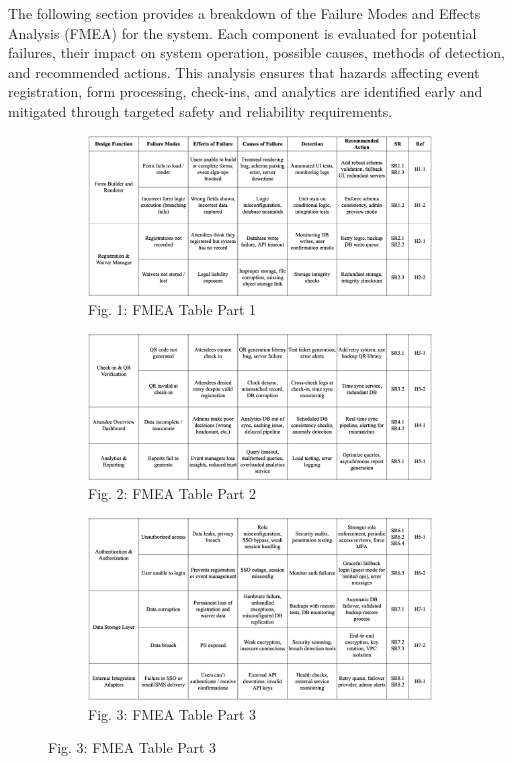 \documentclass{article}
\begin{document}
The following section provides a breakdown of the Failure Modes and Effects Analysis (FMEA) for the system. Each component is evaluated for potential failures, their impact on system operation, possible causes, methods of detection, and recommended actions. This analysis ensures that hazards affecting event registration, form processing, check-ins, and analytics are identified early and mitigated through targeted safety and reliability requirements.
\begin{figure}[H]
\begin{subfigure}{\textwidth}
    \centering\includegraphics[width=\textwidth]{FMEA_images/FMEA_1.png} 
    \caption{Fig. 1: FMEA Table Part 1}
\end{subfigure}

\begin{subfigure}{\textwidth}
    \centering\includegraphics[width=\textwidth]{FMEA_images/FMEA_2.png}
    \caption{Fig. 2: FMEA Table Part 2}
\end{subfigure}

\begin{subfigure}{\textwidth}
    \centering\includegraphics[width=\textwidth]{FMEA_images/FMEA_3.png}
    \caption{Fig. 3: FMEA Table Part 3}
\end{subfigure}
\end{figure}
\end{document}
